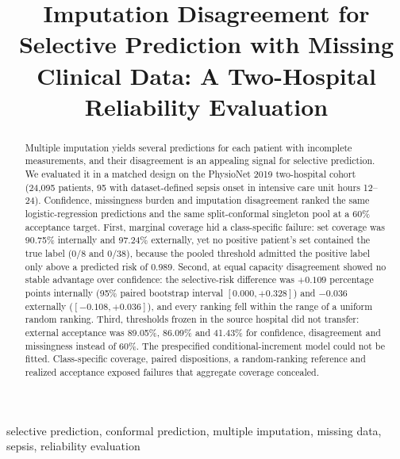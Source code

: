 \documentclass[conference]{IEEEtran}
\newcommand{\confirm}[1]{\textcolor{red}{[#1]}}
\begin{document}

\title{Imputation Disagreement for Selective Prediction with Missing Clinical Data: A Two-Hospital Reliability Evaluation}

\author{\IEEEauthorblockN{\confirm{Author names to be confirmed}}
\IEEEauthorblockA{\confirm{Affiliations and corresponding author to be confirmed}\\
\confirm{Email}}}

\maketitle

\begin{abstract}
Multiple imputation yields several predictions for each patient with incomplete measurements, and their disagreement is an appealing signal for selective prediction. We evaluated it in a matched design on the PhysioNet 2019 two-hospital cohort (24,095 patients, 95 with dataset-defined sepsis onset in intensive care unit hours 12--24). Confidence, missingness burden and imputation disagreement ranked the same logistic-regression predictions and the same split-conformal singleton pool at a 60\% acceptance target. First, marginal coverage hid a class-specific failure: set coverage was 90.75\% internally and 97.24\% externally, yet no positive patient's set contained the true label (0/8 and 0/38), because the pooled threshold admitted the positive label only above a predicted risk of 0.989. Second, at equal capacity disagreement showed no stable advantage over confidence: the selective-risk difference was $+0.109$ percentage points internally (95\% paired bootstrap interval $[0.000, +0.328]$) and $-0.036$ externally ($[-0.108, +0.036]$), and every ranking fell within the range of a uniform random ranking. Third, thresholds frozen in the source hospital did not transfer: external acceptance was 89.05\%, 86.09\% and 41.43\% for confidence, disagreement and missingness instead of 60\%. The prespecified conditional-increment model could not be fitted. Class-specific coverage, paired dispositions, a random-ranking reference and realized acceptance exposed failures that aggregate coverage concealed.
\end{abstract}

\begin{IEEEkeywords}
selective prediction, conformal prediction, multiple imputation, missing data, sepsis, reliability evaluation
\end{IEEEkeywords}
\end{document}
